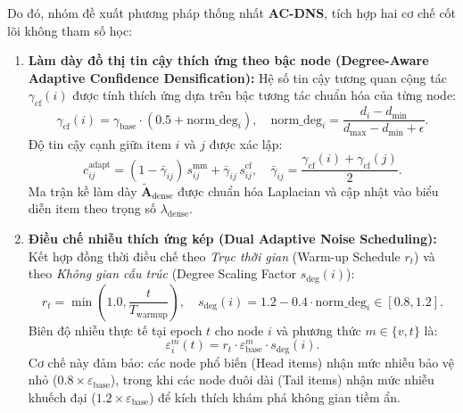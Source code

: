 Do đó, nhóm đề xuất phương pháp thống nhất \textbf{AC-DNS}, tích hợp hai cơ chế cốt lõi không tham số học:
\begin{enumerate}[leftmargin=*, label=(\arabic*)]
  \item \textbf{Làm dày đồ thị tin cậy thích ứng theo bậc node (Degree-Aware Adaptive Confidence Densification):} Hệ số tin cậy tương quan cộng tác $\gamma_{\text{cf}}(i)$ được tính thích ứng dựa trên bậc tương tác chuẩn hóa của từng node:
  \begin{equation}
    \gamma_{\text{cf}}(i) = \gamma_{\text{base}} \cdot (0.5 + \text{norm\_deg}_i), \quad \text{norm\_deg}_i = \frac{d_i - d_{\text{min}}}{d_{\text{max}} - d_{\text{min}} + \epsilon}.
    \label{eq:ac_dns_gamma_deg}
  \end{equation}
  Độ tin cậy cạnh giữa item $i$ và $j$ được xác lập:
  \begin{equation}
    c_{ij}^{\text{adapt}} = (1 - \bar{\gamma}_{ij}) \, s_{ij}^{\text{mm}} + \bar{\gamma}_{ij} \, s_{ij}^{\text{cf}}, \quad \bar{\gamma}_{ij} = \frac{\gamma_{\text{cf}}(i) + \gamma_{\text{cf}}(j)}{2}.
  \end{equation}
  Ma trận kề làm dày $\tilde{\mathbf{A}}_{\text{dense}}$ được chuẩn hóa Laplacian và cập nhật vào biểu diễn item theo trọng số $\lambda_{\text{dense}}$.

  \item \textbf{Điều chế nhiễu thích ứng kép (Dual Adaptive Noise Scheduling):} Kết hợp đồng thời điều chế theo \textit{Trục thời gian} (Warm-up Schedule $r_t$) và theo \textit{Không gian cấu trúc} (Degree Scaling Factor $s_{\text{deg}}(i)$):
  \begin{equation}
    r_t = \min\left(1.0, \frac{t}{T_{\text{warmup}}}\right), \quad 
    s_{\text{deg}}(i) = 1.2 - 0.4 \cdot \text{norm\_deg}_i \in [0.8, 1.2].
    \label{eq:ac_dns_dual_noise}
  \end{equation}
  Biên độ nhiễu thực tế tại epoch $t$ cho node $i$ và phương thức $m \in \{v, t\}$ là:
  \begin{equation}
    \varepsilon_i^m(t) = r_t \cdot \varepsilon_{\text{base}}^m \cdot s_{\text{deg}}(i).
  \end{equation}
  Cơ chế này đảm bảo: các node phổ biến (Head items) nhận mức nhiễu bảo vệ nhỏ ($0.8 \times \varepsilon_{\text{base}}$), trong khi các node đuôi dài (Tail items) nhận mức nhiễu khuếch đại ($1.2 \times \varepsilon_{\text{base}}$) để kích thích khám phá không gian tiềm ẩn.
\end{enumerate}

